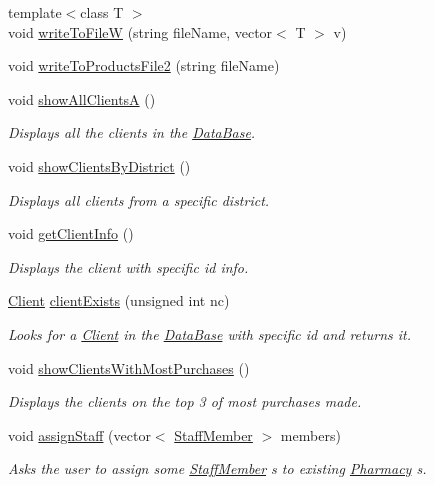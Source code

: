 \begin{DoxyCompactItemize}
{\footnotesize template$<$class T $>$ }\\void \hyperlink{classDataBase_a136d789db1f6c1cd615dc1bdbe27557b}{write\+To\+FileW} (string file\+Name, vector$<$ T $>$ v)
\item 
void \hyperlink{classDataBase_aec542d0eb4b2c2d44abe5cefd25d2057}{write\+To\+Products\+File2} (string file\+Name)
\item 
void \hyperlink{classDataBase_a0c83992321a456f8fa097ea5bbf4a093}{show\+All\+ClientsA} ()
\begin{DoxyCompactList}\small\item\em Displays all the clients in the \hyperlink{classDataBase}{Data\+Base}. \end{DoxyCompactList}\item 
void \hyperlink{classDataBase_a2016794a78b86df19676ea9aba3114bc}{show\+Clients\+By\+District} ()
\begin{DoxyCompactList}\small\item\em Displays all clients from a specific district. \end{DoxyCompactList}\item 
void \hyperlink{classDataBase_aa613181e1960fa22305feae26560960b}{get\+Client\+Info} ()
\begin{DoxyCompactList}\small\item\em Displays the client with specific id info. \end{DoxyCompactList}\item 
\hyperlink{classClient}{Client} \hyperlink{classDataBase_a8575c65a7f0d76352e4b37604562fbc2}{client\+Exists} (unsigned int nc)
\begin{DoxyCompactList}\small\item\em Looks for a \hyperlink{classClient}{Client} in the \hyperlink{classDataBase}{Data\+Base} with specific id and returns it. \end{DoxyCompactList}\item 
void \hyperlink{classDataBase_ab87e9a50f26c934790774b0bf0d62a51}{show\+Clients\+With\+Most\+Purchases} ()
\begin{DoxyCompactList}\small\item\em Displays the clients on the top 3 of most purchases made. \end{DoxyCompactList}\item 
void \hyperlink{classDataBase_aecde8e08249b522ff9431c9feed57996}{assign\+Staff} (vector$<$ \hyperlink{classStaffMember}{Staff\+Member} $>$ members)
\begin{DoxyCompactList}\small\item\em Asks the user to assign some \hyperlink{classStaffMember}{Staff\+Member} \textquotesingle{}s to existing \hyperlink{classPharmacy}{Pharmacy} \textquotesingle{}s. \end{DoxyCompactList}\item 

\end{DoxyCompactItemize}
